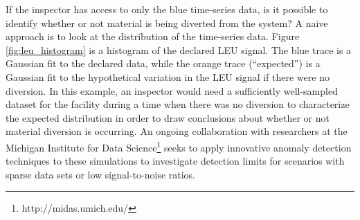 If the inspector has access to only the blue time-series data, is it possible to identify whether or not material is being diverted from the system?  A naive approach is to look at the distribution of the time-series data.  Figure \ref{fig:leu_histogram} is a histogram of the declared \gls{LEU} signal.  The blue trace is a Gaussian fit to the declared data, while the orange trace (``expected'') is a Gaussian fit to the hypothetical variation in the \gls{LEU} signal if there were no diversion.  In this example, an inspector would need a sufficiently well-sampled dataset for the facility during a time when there was no diversion to characterize the expected distribution in order to draw conclusions about whether or not material diversion is occurring. An ongoing collaboration with researchers at the Michigan Institute for Data Science\footnote{http://midas.umich.edu/} seeks to apply innovative anomaly detection techniques to these simulations to investigate detection limits for scenarios with sparse data sets or low signal-to-noise ratios.





  
